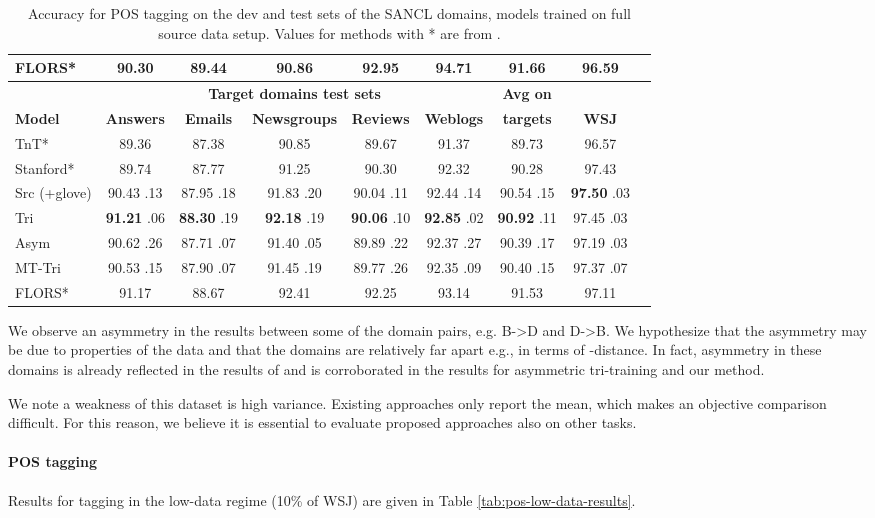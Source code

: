 \documentclass[11pt,a4paper]{article}
\begin{document}
\begin{table*}[ht!]
{\begin{tabular}{l c c c c c c c c}
\midrule 
FLORS*  & 90.30 & 89.44 & 90.86 & 92.95 & 94.71 & 91.66 & 96.59\\
\bottomrule
& \multicolumn{5}{c}{\cellcolor[gray]{.85}\textbf{Target domains test sets}} & \textbf{Avg on} \\
\textbf{Model} & \textbf{Answers} & \textbf{Emails} & \textbf{Newsgroups} & \textbf{Reviews} & \textbf{Weblogs} & \textbf{targets} & \textbf{WSJ} \\
TnT* & 89.36 & 87.38 & 90.85 & 89.67 & 91.37 & 89.73 & 96.57 \\
Stanford* & 89.74 & 87.77 & 91.25 & 90.30 & 92.32 & 90.28 & 97.43 \\
\midrule
Src (+glove) & 90.43 .13 & 87.95 .18 & 91.83 .20 & 90.04 .11& 92.44 .14 & 90.54 .15 & \textbf{97.50} .03\\ 
Tri & \textbf{91.21} .06 & \textbf{88.30} .19 & \textbf{92.18} .19 & \textbf{90.06} .10 & \textbf{92.85} .02 & \textbf{90.92} .11 &  97.45 .03
\\ Asym   & 90.62 .26 & 87.71 .07 & 91.40 .05 & 89.89 .22 & 92.37 .27 & 90.39 .17 & 97.19 .03\\
MT-Tri & 90.53 .15 & 87.90  .07 & 91.45 .19 & 89.77 .26 & 92.35 .09 & 90.40 .15 & 97.37 .07 \\
\midrule
FLORS* & 91.17 & 88.67 & 92.41 & 92.25 & 93.14 & 91.53 & 97.11\\
\bottomrule
\end{tabular}} \caption{Accuracy for POS tagging  on the dev and test sets of the SANCL domains, models trained on full source data setup. Values for methods with * are from \cite{Schnabel2014}.} \label{tbl:POS-dev-test}
\end{table*}


We observe an asymmetry in the results between some of the domain pairs, e.g. B->D and D->B. We hypothesize that the asymmetry may be due to properties of the data and that the domains are relatively far apart e.g., in terms of -distance. In fact, asymmetry in these domains is already reflected in the results of \citet{Blitzer2007} and is corroborated in the results for asymmetric tri-training \cite{Saito2017} and our method. 

We note a weakness of this dataset is high variance. Existing approaches only report the mean, which makes an objective comparison difficult. For this reason, we believe it is essential to evaluate proposed approaches also on other tasks.





\paragraph{POS tagging} Results for tagging in the low-data regime (10\% of WSJ) are given in Table \ref{tab:pos-low-data-results}.
\end{document}
